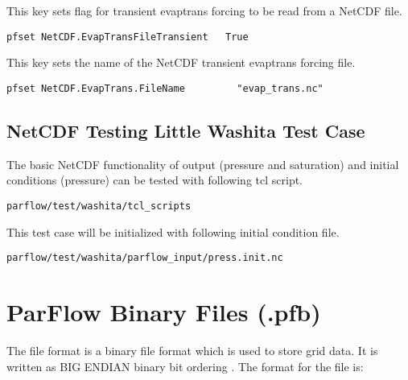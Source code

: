 {This key sets flag for transient evaptrans forcing to be read from a NetCDF file.} 
\begin{display}\begin{verbatim}
pfset NetCDF.EvapTransFileTransient   True
\end{verbatim}\end{display}

{This key sets the name of the NetCDF transient evaptrans forcing file.} 
\begin{display}\begin{verbatim}
pfset NetCDF.EvapTrans.FileName         "evap_trans.nc"
\end{verbatim}\end{display}

\subsection{NetCDF Testing Little Washita Test Case}
The basic NetCDF functionality of output (pressure and saturation) and initial conditions (pressure) can be tested with following tcl script.
\begin{display}\begin{verbatim}
parflow/test/washita/tcl_scripts
\end{verbatim}\end{display}
This test case will be initialized with following initial condition file.
\begin{display}\begin{verbatim}
parflow/test/washita/parflow_input/press.init.nc
\end{verbatim}\end{display}

\section{ParFlow Binary Files (.pfb)}
\label{ParFlow Binary Files (.pfb)}

The  file format is a binary file format which is used
to store \parflow{} grid data.  It is written as BIG ENDIAN binary bit ordering \cite{endian}.
The format for the file is:

